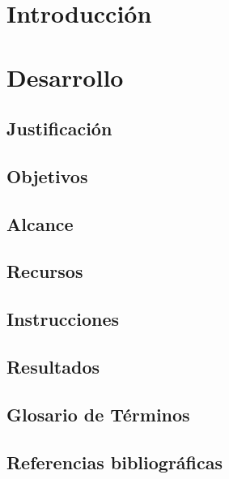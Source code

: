 \documentclass[12pt,a4paper]{book}
\begin{document}
	\frontmatter
	
	\cleardoublepage
	\pagestyle{plain}
	\setcounter{page}{3}
	\tableofcontents
	\listoftables
	\listoffigures
	\cleardoublepage
	\mainmatter
	\pagestyle{headings}
	\setcounter{page}{5}
	\part{Introducción}
	
	\part{Desarrollo}
	\chapter{Justificación}
	
	\chapter{Objetivos}
	
	\chapter{Alcance}
	
	\chapter{Recursos}
	
	\chapter{Instrucciones}
	
	\chapter{Resultados}
	
	\appendix
	\chapter[Glosario]{Glosario de Términos}
	\printnoidxglossary[type=\acronymtype,
    		title=Abreviaturas y acrónimos,nonumberlist]
	\printnoidxglossary[title=Definiciones,nonumberlist]
	\backmatter
	\chapter[Bibliografía]{Referencias
		bibliográficas}
	\printbibliography
\end{document}

